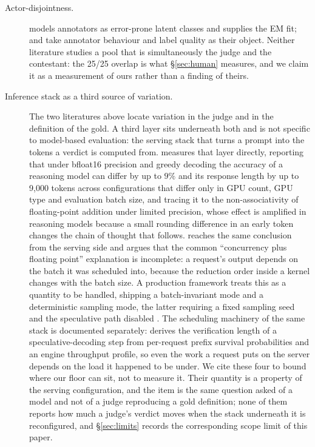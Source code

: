 \documentclass{article}
\begin{document}
\begin{description}
\item[Actor-disjointness.] \cite{dawidskene1979} models annotators as error-prone latent classes and \cite{dempsterlairdrubin1977} supplies the EM fit; \cite{kutlu2020rationales} and \cite{jin2018crowdsourcingqc} take annotator behaviour and label quality as their object. Neither literature studies a pool that is simultaneously the judge and the contestant: the 25/25 overlap is what \S\ref{sec:human} measures, and we claim it as a measurement of ours rather than a finding of theirs.
\item[Inference stack as a third source of variation.] The two literatures above locate variation in the judge and in the definition of the gold. A third layer sits underneath both and is not specific to model-based evaluation: the serving stack that turns a prompt into the tokens a verdict is computed from. \cite{yuan2025numerical} measures that layer directly, reporting that under bfloat16 precision and greedy decoding the accuracy of a reasoning model can differ by up to $9\%$ and its response length by up to 9,000 tokens across configurations that differ only in GPU count, GPU type and evaluation batch size, and tracing it to the non-associativity of floating-point addition under limited precision, whose effect is amplified in reasoning models because a small rounding difference in an early token changes the chain of thought that follows. \cite{he2025nondeterminism} reaches the same conclusion from the serving side and argues that the common ``concurrency plus floating point'' explanation is incomplete: a request's output depends on the batch it was scheduled into, because the reduction order inside a kernel changes with the batch size. A production framework treats this as a quantity to be handled, shipping a batch-invariant mode and a deterministic sampling mode, the latter requiring a fixed sampling seed and the speculative path disabled \cite{deepseek2026deepinfer}. The scheduling machinery of the same stack is documented separately: \cite{cheng2026dspark} derives the verification length of a speculative-decoding step from per-request prefix survival probabilities and an engine throughput profile, so even the work a request puts on the server depends on the load it happened to be under. We cite these four to bound where our floor can sit, not to measure it. Their quantity is a property of the serving configuration, and the item is the same question asked of a model and not of a judge reproducing a gold definition; none of them reports how much a judge's verdict moves when the stack underneath it is reconfigured, and \S\ref{sec:limits} records the corresponding scope limit of this paper.
\end{description}
\end{document}
